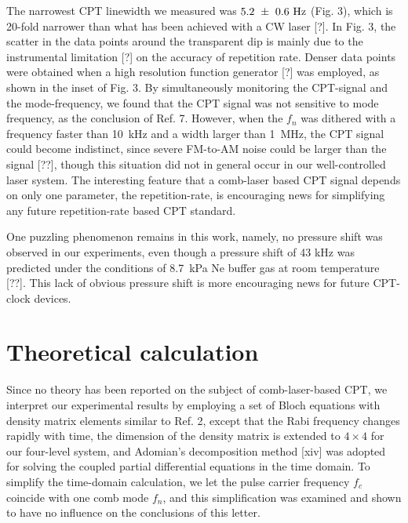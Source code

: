\documentclass[%
aps,
prl,
showpacs,
twocolumn,
]{revtex4}
\begin{document}
The narrowest CPT linewidth we measured was $5.2~\pm~0.6~{\rm Hz}$ (Fig. 3), which is 20-fold 
narrower than what has been achieved with a CW laser [?]. In Fig. 3, the 
scatter in the data points around the transparent dip is mainly due to the 
instrumental limitation [?] on the accuracy of repetition rate. Denser data 
points were obtained when a high resolution function generator [?] was employed, 
as shown in the inset of Fig. 3. By simultaneously monitoring the CPT-signal and
the mode-frequency, we found that the CPT signal was not sensitive to mode frequency, 
as the conclusion of Ref. 7. However, when the $f_n$ was dithered with a frequency faster 
than 10~kHz and a width larger than 1~MHz, the CPT signal could become indistinct, 
since severe FM-to-AM noise could be larger than the signal [??], though this situation did not in general occur in our well-controlled 
laser system. The interesting feature that a comb-laser based CPT signal depends on
 only one parameter, the repetition-rate, is encouraging news for 
simplifying any future repetition-rate based CPT standard. 

One puzzling phenomenon remains in this work, namely, no pressure shift was observed 
in our experiments, even though a pressure shift of 43 kHz was predicted under the 
conditions of 8.7~kPa Ne buffer gas at room temperature [??]. This lack of obvious pressure shift is more encouraging news for future 
CPT-clock devices.

\section{Theoretical calculation}

Since no theory has been reported on the subject of comb-laser-based CPT, we 
interpret our experimental results by employing a set of Bloch equations with 
density matrix elements similar to Ref. 2, except that the Rabi frequency changes 
rapidly with time, the dimension of the density matrix is extended to $4 \times 4$ for our 
four-level system, and Adomian's decomposition method [xiv] was adopted for solving 
the coupled partial differential equations in the time domain. To simplify the 
time-domain calculation, we let the pulse carrier frequency $f_c$ coincide with 
one comb mode $f_n$, and this simplification was examined and shown to have no 
influence on the conclusions of this letter. 
\end{document}
